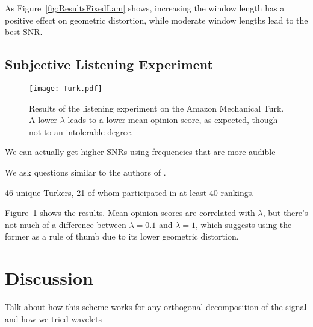 \documentclass[runningheads]{llncs}
\begin{document}
As Figure~\ref{fig:ResultsFixedLam} shows, increasing the window length has a positive effect on geometric distortion, while moderate window lengths lead to the best SNR.

\subsection{Subjective Listening Experiment}

\begin{figure}
  \centering
  \texttt{[image: Turk.pdf]}
  \caption{Results of the listening experiment on the Amazon Mechanical Turk.  A lower $\lambda$ leads to a lower mean opinion score, as expected, though not to an intolerable degree.}
  \label{fig:TurkResults}
\end{figure}


We can actually get higher SNRs using frequencies that are more audible

We ask questions similar to the authors of \cite{bassia2001robust}.

46 unique Turkers, 21 of whom participated in at least 40 rankings.

Figure~\ref{fig:TurkResults} shows the results.  Mean opinion scores are correlated with $\lambda$, but there's not much of a difference between $\lambda=0.1$ and $\lambda=1$, which suggests using the former as a rule of thumb due to its lower geometric distortion.

\section{Discussion}


Talk about how this scheme works for any orthogonal decomposition of the signal and how we tried wavelets

%
%
%


%
\end{document}
